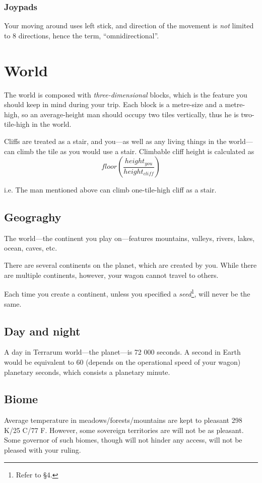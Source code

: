 \documentclass[stock,9pt,nohan]{oblivoir}
\begin{document}
	\subsubsection{Joypads}
	Your moving around uses left stick, and direction of the movement is \emph{not} limited to 8 directions, hence the term, “omni\-direc\-tion\-al”.

\section{World}
The world is composed with \emph{three-dimensional} blocks, which is the feature you should keep in mind during your trip. Each block is a metre-size and a metre-high, so an average-height man should occupy two tiles vertically, thus he is two-tile-high in the world.

Cliffs are treated as a stair, and you---as well as any living things in the world---can climb the tile as you would use a stair. Climbable cliff height is calculated as
\begin{equation}
floor( \frac{height_{you}}{height_{\mathit{cliff}}} )
\end{equation}

i.e. The man mentioned above can climb one-tile-high cliff as a stair.

	\subsection{Geograghy}
	The world---the continent you play on---features mountains, valleys, rivers, lakes, ocean, caves, etc.
	
	There are several continents on the planet, which are created by you. While there are multiple continents, however, your wagon cannot travel to others.
	
	Each time you create a continent, unless you specified a \emph{seed}\footnote{Refer to \S 4.}, will never be the same.
	
	\subsection{Day and night}
	A day in Terrarum world---the planet---is 72 000 seconds. A second in Earth would be equivalent to 60 (depends on the operational speed of your wagon) planetary seconds, which consists a planetary minute.
	
	\subsection{Biome}
	Average temperature in meadows\slash forests\slash mountains are kept to pleasant 298 K\slash 25 \degree{}C\slash 77 \degree{}F. However, some sovereign territories are will not be as pleasant. Some governor of such biomes, though will not hinder any access, will not be pleased with your ruling.
	
\end{document}
